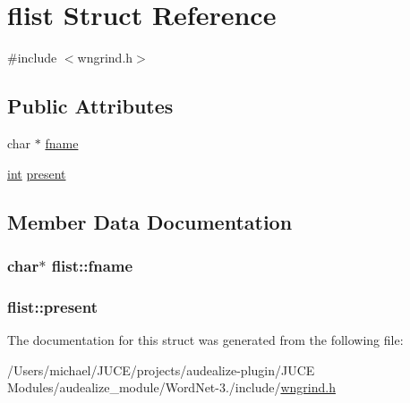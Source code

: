 \hypertarget{structflist}{}\section{flist Struct Reference}
\label{structflist}


{\ttfamily \#include $<$wngrind.\+h$>$}

\subsection*{Public Attributes}
\begin{DoxyCompactItemize}
\item 
char $\ast$ \hyperlink{structflist_aca7b1dc3ad7664a865180232c249d879}{fname}
\item 
\hyperlink{tk_8h_a83f82f76e7fed06f4c49d2db94028a6d}{int} \hyperlink{structflist_a57f4fa00c5ad209ba0cc464a358abeaa}{present}
\end{DoxyCompactItemize}


\subsection{Member Data Documentation}
\subsubsection[{\texorpdfstring{fname}{fname}}]{\setlength{\rightskip}{0pt plus 5cm}char$\ast$ flist\+::fname}\hypertarget{structflist_aca7b1dc3ad7664a865180232c249d879}{}\label{structflist_aca7b1dc3ad7664a865180232c249d879}
\subsubsection[{\texorpdfstring{present}{present}}]{ flist\+::present}\hypertarget{structflist_a57f4fa00c5ad209ba0cc464a358abeaa}{}\label{structflist_a57f4fa00c5ad209ba0cc464a358abeaa}


The documentation for this struct was generated from the following file\+:\begin{DoxyCompactItemize}
\item 
/\+Users/michael/\+J\+U\+C\+E/projects/audealize-\/plugin/\+J\+U\+C\+E Modules/audealize\+\_\+module/\+Word\+Net-\/3./include/\hyperlink{wngrind_8h}{wngrind.\+h}\end{DoxyCompactItemize}
